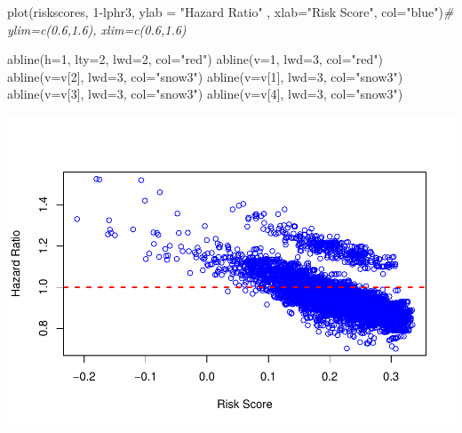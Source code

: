 \documentclass[
  11pt,
]{article}
\newenvironment{Shaded}{\begin{snugshade}}{\end{snugshade}}
\newcommand{\AttributeTok}[1]{\textcolor[rgb]{0.77,0.63,0.00}{#1}}
\newcommand{\CommentTok}[1]{\textcolor[rgb]{0.56,0.35,0.01}{\textit{#1}}}
\newcommand{\DecValTok}[1]{\textcolor[rgb]{0.00,0.00,0.81}{#1}}
\newcommand{\FunctionTok}[1]{\textcolor[rgb]{0.00,0.00,0.00}{#1}}
\newcommand{\NormalTok}[1]{#1}
\newcommand{\SpecialCharTok}[1]{\textcolor[rgb]{0.00,0.00,0.00}{#1}}
\newcommand{\StringTok}[1]{\textcolor[rgb]{0.31,0.60,0.02}{#1}}
\begin{document}
\begin{Shaded}
\begin{Highlighting}[]
\FunctionTok{plot}\NormalTok{(riskscores, }\DecValTok{1}\SpecialCharTok{{-}}\NormalTok{lphr3, }\AttributeTok{ylab =} \StringTok{"Hazard Ratio"}\NormalTok{ ,}
     \AttributeTok{xlab=}\StringTok{"Risk Score"}\NormalTok{, }\AttributeTok{col=}\StringTok{"blue"}\NormalTok{)}\CommentTok{\# ylim=c(0.6,1.6), xlim=c(0.6,1.6)}

\FunctionTok{abline}\NormalTok{(}\AttributeTok{h=}\DecValTok{1}\NormalTok{, }\AttributeTok{lty=}\DecValTok{2}\NormalTok{, }\AttributeTok{lwd=}\DecValTok{2}\NormalTok{, }\AttributeTok{col=}\StringTok{"red"}\NormalTok{)}
\FunctionTok{abline}\NormalTok{(}\AttributeTok{v=}\DecValTok{1}\NormalTok{, }\AttributeTok{lwd=}\DecValTok{3}\NormalTok{, }\AttributeTok{col=}\StringTok{"red"}\NormalTok{)}
\FunctionTok{abline}\NormalTok{(}\AttributeTok{v=}\NormalTok{v[}\DecValTok{2}\NormalTok{], }\AttributeTok{lwd=}\DecValTok{3}\NormalTok{, }\AttributeTok{col=}\StringTok{"snow3"}\NormalTok{)}
\FunctionTok{abline}\NormalTok{(}\AttributeTok{v=}\NormalTok{v[}\DecValTok{1}\NormalTok{], }\AttributeTok{lwd=}\DecValTok{3}\NormalTok{, }\AttributeTok{col=}\StringTok{"snow3"}\NormalTok{)}
\FunctionTok{abline}\NormalTok{(}\AttributeTok{v=}\NormalTok{v[}\DecValTok{3}\NormalTok{], }\AttributeTok{lwd=}\DecValTok{3}\NormalTok{, }\AttributeTok{col=}\StringTok{"snow3"}\NormalTok{)}
\FunctionTok{abline}\NormalTok{(}\AttributeTok{v=}\NormalTok{v[}\DecValTok{4}\NormalTok{], }\AttributeTok{lwd=}\DecValTok{3}\NormalTok{, }\AttributeTok{col=}\StringTok{"snow3"}\NormalTok{)}
\end{Highlighting}
\end{Shaded}

\includegraphics{Hazard_and_Risk_plot_updated_files/figure-latex/unnamed-chunk-14-1.pdf}
\end{document}
